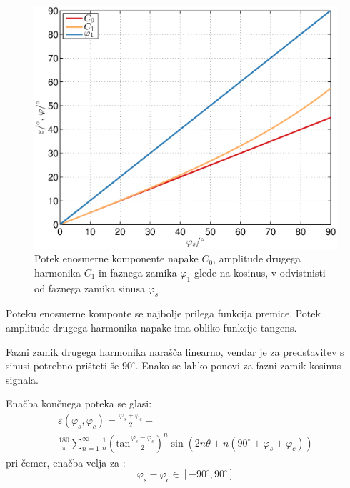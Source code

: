 \documentclass[a4paper]{article}
\begin{document}
\begin{figure}[!htb]
	\begin{center}
		\includegraphics[width=\linewidth]{./Slike/fis.eps}
		\caption{Potek enosmerne komponente napake $C_0$, amplitude drugega harmonika $C_1$ in faznega zamika $\varphi_1$ glede na kosinus, v odvistnisti od faznega zamika sinusa $\varphi_{s}$} \label{fig:fis}
	\end{center}
\end{figure}

Poteku enosmerne komponte se najbolje prilega funkcija premice.
Potek amplitude drugega harmonika napake ima obliko funkcije tangens.

Fazni zamik drugega harmonika narašča linearno, vendar je za predstavitev s sinusi potrebno prišteti še $90^\circ$. Enako se lahko ponovi za fazni zamik kosinus signala.

Enačba končnega poteka se glasi:
\begin{multline}
\label{equ:fis_err}
\varepsilon(\varphi_{s},\varphi_{c}) = \frac{\varphi_{s}+\varphi_{c}}{2}+\\ \frac{180}{\pi}\sum_{n=1}^{\infty}\frac{1}{n} (\mathrm{tan}\frac{\varphi_{s}-\varphi_{c}}{2})^n \sin (2n \theta+n(90^\circ +\varphi_{s}+\varphi_{c}))
\end{multline}
pri čemer, enačba velja za :
$$ \varphi_{s}-\varphi_{c} \in [ -90^\circ , 90^\circ ] $$
\end{document}
